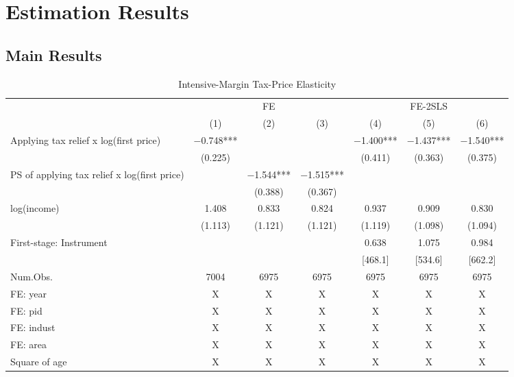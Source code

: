 \documentclass[
  11pt,
  a4paper,
]{article}
\begin{document}
\hypertarget{result}{%
\section{Estimation Results}\label{result}}

\hypertarget{main-results}{%
\subsection{Main Results}\label{main-results}}

\begin{table}

\caption{\label{tab:MainIntensive}Intensive-Margin Tax-Price Elasticity}
\centering
\fontsize{8}{10}\selectfont
\begin{threeparttable}
\begin{tabular}[t]{lcccccc}
\toprule
\multicolumn{1}{c}{ } & \multicolumn{3}{c}{FE} & \multicolumn{3}{c}{FE-2SLS} \\
\cmidrule(l{3pt}r{3pt}){2-4} \cmidrule(l{3pt}r{3pt}){5-7}
  & (1) & (2) & (3) & (4) & (5) & (6)\\
\midrule
Applying tax relief x log(first price) & \num{-0.748}*** &  &  & \num{-1.400}*** & \num{-1.437}*** & \num{-1.540}***\\
 & (\num{0.225}) &  &  & (\num{0.411}) & (\num{0.363}) & (\num{0.375})\\
PS of applying tax relief x log(first price) &  & \num{-1.544}*** & \num{-1.515}*** &  &  & \\
 &  & (\num{0.388}) & (\num{0.367}) &  &  & \\
log(income) & \num{1.408} & \num{0.833} & \num{0.824} & \num{0.937} & \num{0.909} & \num{0.830}\\
 & (\num{1.113}) & (\num{1.121}) & (\num{1.121}) & (\num{1.119}) & (\num{1.098}) & (\num{1.094})\\
\midrule
First-stage: Instrument &  &  &  & 0.638 & 1.075 & 0.984\\
 &  &  &  & [468.1] & [534.6] & [662.2]\\
Num.Obs. & \num{7004} & \num{6975} & \num{6975} & \num{6975} & \num{6975} & \num{6975}\\
FE: year & X & X & X & X & X & X\\
FE: pid & X & X & X & X & X & X\\
FE: indust & X & X & X & X & X & X\\
FE: area & X & X & X & X & X & X\\
Square of age & X & X & X & X & X & X\\

\end{tabular}
\end{threeparttable}
\end{table}
\end{document}
